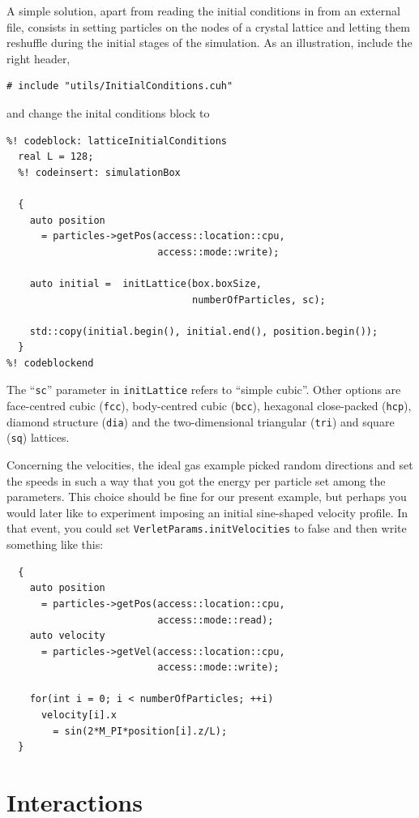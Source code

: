 A simple solution, apart from reading the initial conditions in from an external 
file, consists in setting particles on the nodes of a crystal lattice and 
letting them reshuffle during the initial stages of the simulation. As an
illustration, include the right header,
\begin{lstlisting}
# include "utils/InitialConditions.cuh"
\end{lstlisting}
and change the inital conditions block to
\begin{lstlisting}
%! codeblock: latticeInitialConditions
  real L = 128;
  %! codeinsert: simulationBox

  {
    auto position
      = particles->getPos(access::location::cpu,
                          access::mode::write);

    auto initial =  initLattice(box.boxSize,
                                numberOfParticles, sc);

    std::copy(initial.begin(), initial.end(), position.begin());
  }
%! codeblockend
\end{lstlisting}
The ``\texttt{sc}'' parameter in \texttt{initLattice} refers to ``simple
cubic''. Other options are face-centred cubic (\texttt{fcc}), body-centred cubic
(\texttt{bcc}), hexagonal close-packed (\texttt{hcp}), diamond structure
(\texttt{dia}) and the two-dimensional triangular (\texttt{tri}) and square
(\texttt{sq}) lattices.

Concerning the velocities, the ideal gas example picked random directions and set
the speeds in such a way that you got the energy per particle set among the
parameters. This choice should be fine for our present example, but perhaps you
would later like to experiment imposing an initial sine-shaped velocity profile.
In that event, you could set \texttt{VerletParams.initVelocities} to false and
then write something like this:
\begin{lstlisting}
  {
    auto position
      = particles->getPos(access::location::cpu,
                          access::mode::read);
    auto velocity
      = particles->getVel(access::location::cpu,
                          access::mode::write);

    for(int i = 0; i < numberOfParticles; ++i)
      velocity[i].x
        = sin(2*M_PI*position[i].z/L);
  }
\end{lstlisting}

\section{Interactions}

